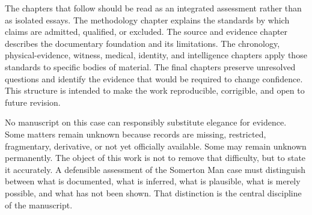 The chapters that follow should be read as an integrated assessment rather than as isolated essays. The methodology chapter explains the standards by which claims are admitted, qualified, or excluded. The source and evidence chapter describes the documentary foundation and its limitations. The chronology, physical-evidence, witness, medical, identity, and intelligence chapters apply those standards to specific bodies of material. The final chapters preserve unresolved questions and identify the evidence that would be required to change confidence. This structure is intended to make the work reproducible, corrigible, and open to future revision.

No manuscript on this case can responsibly substitute elegance for evidence. Some matters remain unknown because records are missing, restricted, fragmentary, derivative, or not yet officially available. Some may remain unknown permanently. The object of this work is not to remove that difficulty, but to state it accurately. A defensible assessment of the Somerton Man case must distinguish between what is documented, what is inferred, what is plausible, what is merely possible, and what has not been shown. That distinction is the central discipline of the manuscript.
